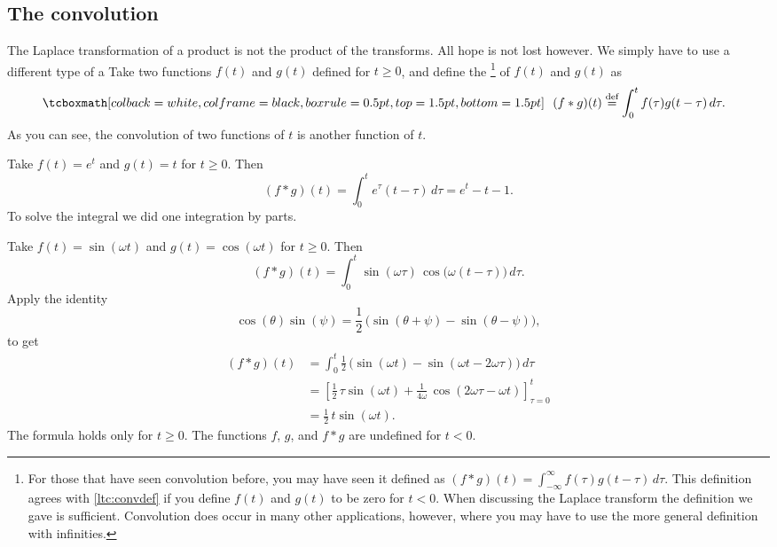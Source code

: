 \subsection{The convolution}

The Laplace transformation of a product is not the product
of the transforms.  All hope is not lost however.  We simply have to use
a different type of a 
Take
two functions $f(t)$ and $g(t)$ defined for $t \geq 0$,
and define the \emph{}%
\footnote{%
For those that have seen convolution before, you may have
seen it defined as
$(f * g)(t) =
\int_{-\infty}^\infty f(\tau) g(t-\tau) \, d\tau$.  This definition
agrees with \eqref{ltc:convdef} if you define $f(t)$ and $g(t)$
to be zero for $t < 0$.
When discussing the Laplace transform the definition we gave is
sufficient.  Convolution does occur in many other applications, however,
where you may have to use the more general definition with infinities.
}
of $f(t)$ and $g(t)$ as
\begin{equation} \label{ltc:convdef}
\mybxbg{~~
(f * g)(t) \overset{\text{def}}{=}
\int_0^t f(\tau) g(t-\tau) \, d\tau .
~~}
\end{equation}
As you can see, the convolution of two functions of $t$ is another function of $t$.


\begin{example}
Take $f(t) = e^t$ and $g(t) = t$ for $t \geq 0$.  Then 
\begin{equation*}
(f*g)(t)
=
\int_0^t e^\tau (t-\tau) \, d\tau
=
e^t - t - 1 .
\end{equation*}
To solve the integral we
did one integration by parts.
\end{example}

\begin{example} \label{ltc:convsincosex}
Take $f(t) = \sin (\omega t)$ and $g(t) = \cos (\omega t)$ for $t \geq 0$.
Then 
\begin{equation*}
(f*g)(t)
=
\int_0^t  \sin ( \omega \tau ) \,
\cos \bigl( \omega (t-\tau) \bigr) \, d\tau .
\end{equation*}
Apply the identity
\begin{equation*}
\cos (\theta) \sin (\psi) =
\frac{1}{2} \, \bigl( \sin (\theta + \psi) - \sin (\theta - \psi) \bigr) ,
\end{equation*}
to get
\begin{equation*}
\begin{split}
(f*g)(t)
& =
\int_0^t
\frac{1}{2} \, \bigl( \sin (\omega t) - \sin (\omega t - 2 \omega \tau
) \bigr) \, d\tau
\\
& =
\left[ \frac{1}{2} \, \tau  \sin (\omega t) + \frac{1}{4\omega} \, \cos (2 \omega \tau -
\omega t) \right]_{\tau=0}^t
\\
& = \frac{1}{2} \, t \sin (\omega t) .
\end{split}
\end{equation*}
The formula holds only for $t \geq 0$.  The functions $f$, $g$,
and $f*g$ are undefined for $t < 0$.
\end{example}


